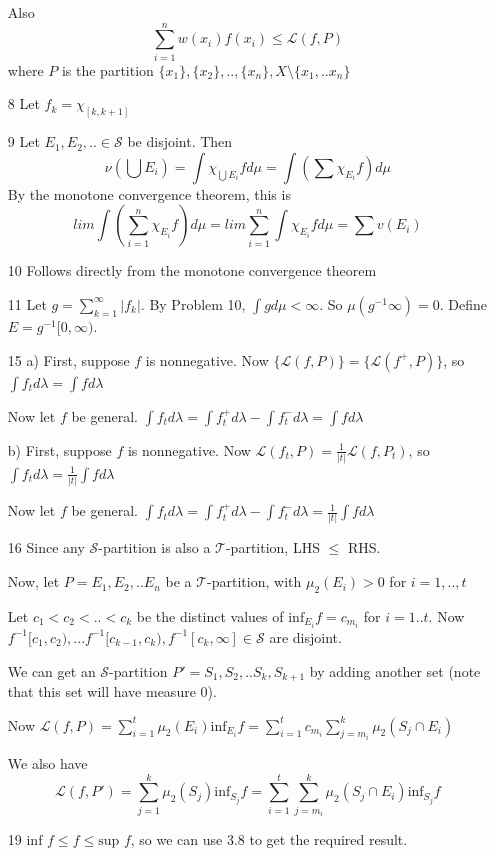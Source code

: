 \documentclass{article}
\begin{document}
\begin{itemize}
    Also \[\sum_{i=1}^nw(x_i)f(x_i)\leq\mathcal{L}(f,P)\] where $P$ is the partition $\{x_1\},\{x_2\},..,\{x_n\},X\setminus\{x_1,..x_n\}$

    \item[8] Let $f_k=\chi_{[k,k+1]}$

    \item [9]
      Let $E_1,E_2,.. \in \mathcal{S}$ be disjoint. Then \[\nu(\bigcup E_i)=\int \chi_{\bigcup E_i}fd\mu=\int (\sum \chi_{E_i}f)d\mu\]
      By the monotone convergence theorem, this is \[lim\int (\sum_{i=1}^n \chi_{E_i}f)d\mu=lim \sum_{i=1}^n \int \chi_{E_i}fd\mu=\sum v(E_i)\]

    \item [10] Follows directly from the monotone convergence theorem

    \item[11] Let $g=\sum_{k=1}^\infty|f_k|$. By Problem 10, $\int gd\mu<\infty$. So $\mu(g^{-1}\infty)=0$. Define $E=g^{-1}[0,\infty)$.

    \item[15]a) First, suppose $f$ is nonnegative. Now $\{\mathcal{L}(f,P)\}=\{\mathcal{L}(f^+,P)\}$, so $\int f_td\lambda=\int fd\lambda$

    Now let $f$ be general. $\int f_td\lambda=\int f_t^+d\lambda-\int f_t^-d\lambda=\int fd\lambda$

    b) First, suppose $f$ is nonnegative. Now $\mathcal{L}(f_t,P)=\frac{1}{|t|}\mathcal{L}(f,P_t)$, so \\$\int f_t d\lambda=\frac{1}{|t|}\int fd\lambda$

    Now let $f$ be general. $\int f_td\lambda=\int f_t^+d\lambda-\int f_t^-d\lambda=\frac{1}{|t|}\int f d\lambda$

    \item [16] Since any $\mathcal{S}$-partition is also a $\mathcal{T}$-partition, LHS $\leq$ RHS. 
    
    Now, let $P=E_1,E_2,..E_n$ be a $\mathcal{T}$-partition, with $\mu_2(E_i)>0$ for $i=1,..,t$ 
    
    
    Let $c_1<c_2<..<c_k$ be the distinct values of $\text{inf}_{E_i}f=c_{m_i}$ for $i=1..t$. Now $f^{-1}[c_1,c_2),...f^{-1}[c_{k-1},c_k),f^{-1}[c_k,\infty]\in \mathcal{S}$ are disjoint. 
    
    We can get an $\mathcal{S}$-partition $P'=S_1,S_2,..S_k,S_{k+1}$ by adding another set (note that this set will have measure 0). 
    
    Now $\mathcal{L}(f,P)=\sum_{i=1}^t \mu_2(E_i)\text{inf}_{E_i}f=\sum_{i=1}^t c_{m_i}\sum_{j=m_i}^k\mu_2(S_j\cap E_i)$

    We also have \[\mathcal{L}(f,P')=\sum_{j=1}^k\mu_2(S_j)\text{inf}_{S_j}f=\sum_{i=1}^t\sum_{j=m_i}^k  \mu_2(S_j\cap E_i)\text{inf}_{S_j}f\]

    \item[19]$\text{inf }f\leq f\leq \text{sup } f$, so we can use 3.8 to get the required result.
    

    
\end{itemize}
\end{document}
